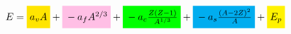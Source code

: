 \documentclass{article}
\def\xstrut{\vphantom{\frac{(A)^1}{(B)^1}}}
\begin{document}
\begin{equation}\label{eq:6}
E = %
\colorbox{darkyellow}{$\xstrut a_vA$} +
\colorbox{hellmagenta}{$\xstrut -a_fA^{2/3}$} +
\colorbox{green}{$\xstrut -a_c\frac{Z(Z-1)}{A^{1/3}}$} +
\colorbox{cyan}{$\xstrut -a_s\frac{(A-2Z)^2}{A}$} +
\colorbox{yellow}{$\xstrut E_p$}
\end{equation}
\end{document}
